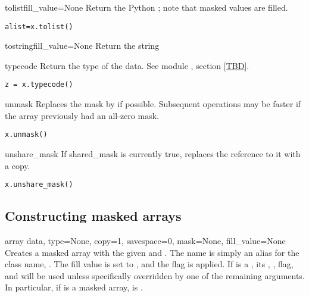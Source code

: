 \begin{methoddesc}[MaskedArray]{tolist}{fill_value=None}
   Return the Python  ; note
   that masked values are filled. 
\begin{verbatim}
alist=x.tolist()
\end{verbatim}
\end{methoddesc}

\begin{methoddesc}[MaskedArray]{tostring}{fill_value=None}
   Return the string 
\end{methoddesc}

\begin{methoddesc}[MaskedArray]{typecode}{}
   Return the type of the data. See module , section \ref{TBD}.
\begin{verbatim}
z = x.typecode()
\end{verbatim}
\end{methoddesc}

\begin{methoddesc}[MaskedArray]{unmask}{}
   Replaces the mask by  if possible. Subsequent operations may
   be faster if the array previously had an all-zero mask.
\begin{verbatim}
x.unmask()
\end{verbatim}
\end{methoddesc}

\begin{methoddesc}[MaskedArray]{unshare_mask}{}
   If shared_mask is currently true, replaces the reference to it with a
   copy. 
\begin{verbatim}
x.unshare_mask()
\end{verbatim}
\end{methoddesc}


\subsection{Constructing masked arrays}
\label{sec:numarray.ma:constructing-mask-arrays}

\begin{methoddesc}[MaskedArray]{array}
   {data, type=None, copy=1, savespace=0, mask=None, fill_value=None}
   Creates a masked array with the given  and
   .  The name  is simply an alias for the class name,
   .  The fill value is set to , and the
    flag is applied. If  is a , its
   , ,  flag, and
    will be used unless specifically overridden by one of
   the remaining arguments. In particular, if  is a masked array,
    is .
\end{methoddesc}


